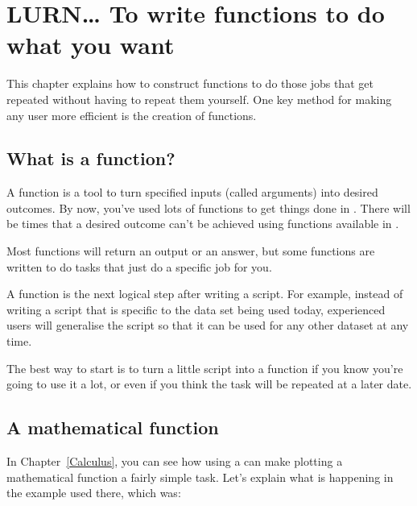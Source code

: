 



\chapter{LURN\ldots{} To write functions to do what you want} 
\label{Functions} 
 



 
This chapter explains how to construct functions to do those jobs that get repeated without having to repeat them yourself. One key method for making any \R{} user more efficient is the creation of functions.  
 
\section{What is a function?} 
 
A function is a tool to turn specified inputs (called arguments) into desired outcomes. By now, you've used lots of functions to get things done in \R{}. There will be times that a desired outcome can't be achieved using functions available in \R{}.  
 
Most functions will return an output or an answer, but some functions are written to do tasks that just do a specific job for you. 
 
A function is the next logical step after writing a script. For example, instead of writing a script that is specific to the data set being used today, experienced \R{} users will generalise the script so that it can be used for any other dataset at any time.  
  
The best way to start is to turn a little script into a function if you know you're going to use it a lot, or even if you think the task will be repeated at a later date. 
 
 
\section{A mathematical function} 
 
In Chapter~\ref{Calculus}, you can see how using a  can make plotting a mathematical function a fairly simple task. Let's explain what is happening in the example used there, which was: 

